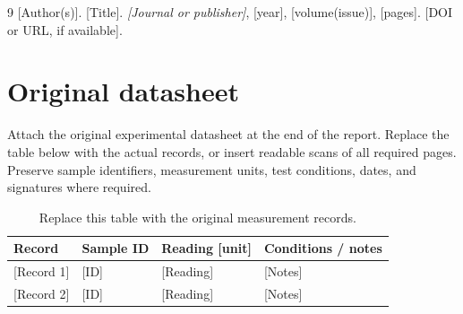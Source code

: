 \documentclass[12pt]{article}
\begin{document}
\begin{thebibliography}{9}
  [Author(s)]. [Title]. \textit{[Journal or publisher]}, [year],
  [volume(issue)], [pages]. [DOI or URL, if available].
\end{thebibliography}

\clearpage
\appendix
\section{Original datasheet}
Attach the original experimental datasheet at the end of the report. Replace
the table below with the actual records, or insert readable scans of all required
pages. Preserve sample identifiers, measurement units, test conditions, dates,
and signatures where required.

\begin{table}[htbp]
  \centering
  \caption{Replace this table with the original measurement records.}
  \begin{tabularx}{\linewidth}{@{}lXXX@{}}
    \toprule
    Record & Sample ID & Reading [unit] & Conditions / notes \\
    \midrule
    {[Record 1]} & [ID] & [Reading] & [Notes] \\
    {[Record 2]} & [ID] & [Reading] & [Notes] \\
    \bottomrule
  \end{tabularx}
\end{table}
\end{document}
